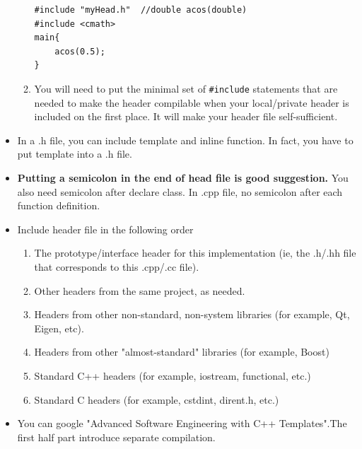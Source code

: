 \documentclass[a4paper,11pt,twoside]{book}
\begin{document}
\begin{itemize}
\begin{enumerate}
\begin{lstlisting}[numbers=none]
#include "myHead.h"  //double acos(double)
#include <cmath>
main{
	acos(0.5);
}
\end{lstlisting}
		
		\item You will need to put the minimal set of \texttt{\#include} statements that are needed to make the header compilable when your local/private header is included on the first place.  It will make your header file self-sufficient.
	\end{enumerate}
	
	\item In a .h file, you can include template and inline function.  In fact, you have to put template into a .h file. 
	
	\item \textbf{Putting a semicolon in the end of head file is good suggestion.} You also need semicolon after declare class. In .cpp file, no semicolon after each function definition.
	
	\item Include header file in the following order
	\begin{enumerate}
		\item The prototype/interface header for this implementation (ie, the .h/.hh file that corresponds to this .cpp/.cc file).
		\item Other headers from the same project, as needed.
		\item Headers from other non-standard, non-system libraries (for example, Qt, Eigen, etc).
		\item Headers from other "almost-standard" libraries (for example, Boost)
		\item Standard C++ headers (for example, iostream, functional, etc.)
		\item Standard C headers (for example, cstdint, dirent.h, etc.)
	\end{enumerate}
	
	\item You can google "Advanced Software Engineering with C++ Templates".The first half part introduce separate compilation.
\end{itemize}
\end{document}
